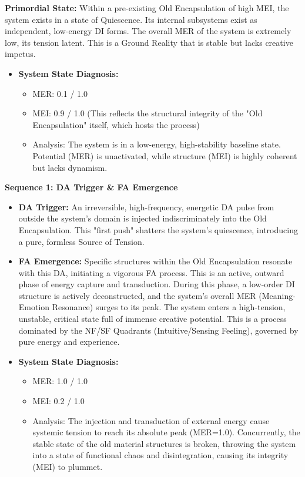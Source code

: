 \documentclass[11pt, a4paper]{article}
\begin{document}
\textbf{Primordial State:}
Within a pre-existing Old Encapsulation of high MEI, the system exists in a state of Quiescence. Its internal subsystems exist as independent, low-energy DI forms. The overall MER of the system is extremely low, its tension latent. This is a Ground Reality that is stable but lacks creative impetus.
\begin{itemize}
    \item \textbf{System State Diagnosis:}
    \begin{itemize}
        \item MER: 0.1 / 1.0
        \item MEI: 0.9 / 1.0 (This reflects the structural integrity of the "Old Encapsulation" itself, which hosts the process)
        \item Analysis: The system is in a low-energy, high-stability baseline state. Potential (MER) is unactivated, while structure (MEI) is highly coherent but lacks dynamism.
    \end{itemize}
\end{itemize}

\textbf{Sequence 1: DA Trigger \& FA Emergence}
\begin{itemize}
    \item \textbf{DA Trigger:} An irreversible, high-frequency, energetic DA pulse from outside the system's domain is injected indiscriminately into the Old Encapsulation. This "first push" shatters the system's quiescence, introducing a pure, formless Source of Tension.
    \item \textbf{FA Emergence:} Specific structures within the Old Encapsulation resonate with this DA, initiating a vigorous FA process. This is an active, outward phase of energy capture and transduction. During this phase, a low-order DI structure is actively deconstructed, and the system's overall MER (Meaning-Emotion Resonance) surges to its peak. The system enters a high-tension, unstable, critical state full of immense creative potential. This is a process dominated by the NF/SF Quadrants (Intuitive/Sensing Feeling), governed by pure energy and experience.
    \item \textbf{System State Diagnosis:}
    \begin{itemize}
        \item MER: 1.0 / 1.0
        \item MEI: 0.2 / 1.0
        \item Analysis: The injection and transduction of external energy cause systemic tension to reach its absolute peak (MER=1.0). Concurrently, the stable state of the old material structures is broken, throwing the system into a state of functional chaos and disintegration, causing its integrity (MEI) to plummet.
    \end{itemize}
\end{itemize}
\end{document}
